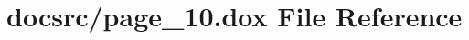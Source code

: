 \hypertarget{page__10_8dox}{\section{docsrc/page\-\_\-10.dox File Reference}
\label{page__10_8dox}
}
